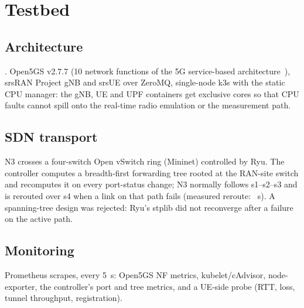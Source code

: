 \section{Testbed}
\subsection{Architecture}
. Open5GS v2.7.7 (10 network functions of the 5G service-based architecture~\cite{ts23501}), srsRAN Project gNB and srsUE over
ZeroMQ, single-node k3s with the static CPU manager: the gNB, UE and UPF containers get exclusive
cores so that CPU faults cannot spill onto the real-time radio emulation or the measurement path.
\subsection{SDN transport}
N3 crosses a four-switch Open vSwitch ring (Mininet) controlled by Ryu. The controller computes a
breadth-first forwarding tree rooted at the RAN-site switch and recomputes it on every port-status
change; N3 normally follows s1--s2--s3 and is rerouted over s4 when a link on that path fails
(measured reroute: ~s). A spanning-tree design was rejected: Ryu's stplib did not
reconverge after a failure on the active path.
\subsection{Monitoring}
Prometheus scrapes, every \SI{5}{s}: Open5GS NF metrics, kubelet/cAdvisor, node-exporter, the
controller's port and tree metrics, and a UE-side probe (RTT, loss, tunnel throughput, registration).
